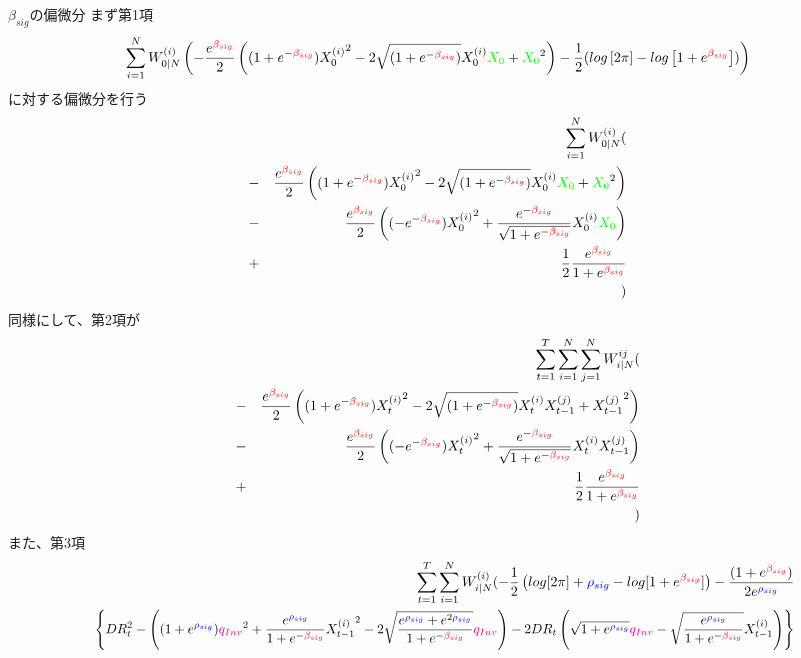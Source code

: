 \documentclass[a4j,11pt]{jarticle}
\makeatletter
\def\subsection{\@startsection{subsection}{1}{\z@}
   {0\Cvs \@plus.5\Cdp \@minus.2\Cdp}
   {0.01\Cvs \@plus.3\Cdp}
   {\normalfont \normalsize \bfseries}}
\makeatother
\begin{document}
\subsection{$\beta_{sig}$の偏微分}
まず第1項
$$
\sum_{i=1}^NW_{0|N}^{(i)} \left(-\frac{e^{\textcolor{red}{\beta_{sig}}}}{2}\left((1+e^{-\textcolor{red}{\beta_{sig}}}){X_0^{(i)}}^2 -2\sqrt{(1+e^{-\textcolor{red}{\beta_{sig}}})}X_0^{(i)}\textcolor{green}{X_0} + \textcolor{green}{X_0}^2 \right)-\frac{1}{2}(log\left[2\pi\right] - log\left[1 + e^{\textcolor{red}{\beta_{sig}}}\right])\right)
$$
に対する偏微分を行う
\begin{eqnarray}
&&\sum_{i=1}^NW_{0|N}^{(i)}(\nonumber\\
&-&\frac{e^{\textcolor{red}{\beta_{sig}}}}{2}\left((1+e^{-\textcolor{red}{\beta_{sig}}}){X_0^{(i)}}^2 -2\sqrt{(1+e^{-\textcolor{red}{\beta_{sig}}})}X_0^{(i)}\textcolor{green}{X_0} + \textcolor{green}{X_0}^2 \right)\nonumber\\
&-&\frac{e^{\textcolor{red}{\beta_{sig}}}}{2}\left((-e^{-\textcolor{red}{\beta_{sig}}}){X_0^{(i)}}^2 +\frac{e^{-\textcolor{red}{\beta_{sig}}}}{\sqrt{1+e^{-\textcolor{red}{\beta_{sig}}}}}X_0^{(i)}\textcolor{green}{X_0} \right)\nonumber\\
&+&\frac{1}{2}\frac{e^{\textcolor{red}{\beta_{sig}}}}{1+e^{\textcolor{red}{\beta_{sig}}}}\nonumber\\
&&)
\end{eqnarray}
同様にして、第2項が
\begin{eqnarray}
&&\sum_{t=1}^{T}\sum_{i=1}^{N}\sum_{j=1}^{N}W_{i|N}^{ij}(\nonumber\\
&-&\frac{e^{\textcolor{red}{\beta_{sig}}}}{2}\left((1+e^{-\textcolor{red}{\beta_{sig}}}){X_t^{(i)}}^2 -2\sqrt{(1+e^{-\textcolor{red}{\beta_{sig}}})}X_t^{(i)}{X_{t-1}^{(j)}} + {X_{t-1}^{(j)}}^2 \right)\nonumber\\
&-&\frac{e^{\textcolor{red}{\beta_{sig}}}}{2}\left((-e^{-\textcolor{red}{\beta_{sig}}}){X_t^{(i)}}^2 +\frac{e^{-\textcolor{red}{\beta_{sig}}}}{\sqrt{1+e^{-\textcolor{red}{\beta_{sig}}}}}X_t^{(i)}{X_{t-1}^{(j)}} \right)\nonumber\\
&+&\frac{1}{2}\frac{e^{\textcolor{red}{\beta_{sig}}}}{1+e^{\textcolor{red}{\beta_{sig}}}}\nonumber\\
&&)
\end{eqnarray}
また、第3項
\begin{eqnarray*}
&&\sum_{t=1}^{T}\sum_{i=1}^{N}W_{i|N}^{(i)}
(-\frac{1}{2} \left(log[2\pi] + \textcolor{blue}{\rho_{sig}} - log[1+e^{\textcolor{red}{\beta_{sig}}}]\right)
-\frac{(1+e^{\textcolor{red}{\beta_{sig}}})}{2e^{\textcolor{blue}{\rho_{sig}}}}\\
&&
\scalebox{0.95}{$\displaystyle
\left\{DR_t^2-
\left((1+ e^{\textcolor{blue}{\rho_{sig}}} ) \textcolor{magenta}{q_{Inv}}^2+\frac{e^{\textcolor{blue}{\rho_{sig}}}}{1+e^{-\textcolor{red}{\beta_{sig}}}}{X_{t-1}^{(i)}}^2 - 2 \sqrt{\frac{e^{\textcolor{blue}{\rho_{sig}}} + e^{2\textcolor{blue}{\rho_{sig}}} }{1+e^{-\textcolor{red}{\beta_{sig}}}} }\textcolor{magenta}{q_{Inv}}\right)
 - 2DR_t
\left(\sqrt{1+e^{\textcolor{blue}{\rho_{sig}}}} \textcolor{magenta}{q_{Inv}}-\sqrt{\frac{e^{\textcolor{blue}{\rho_{sig}}}}{1+e^{-\textcolor{red}{\beta_{sig}}}}}X_{t-1}^{(i)}\right)
 \right\}
$}
\end{eqnarray*}
\end{document}
